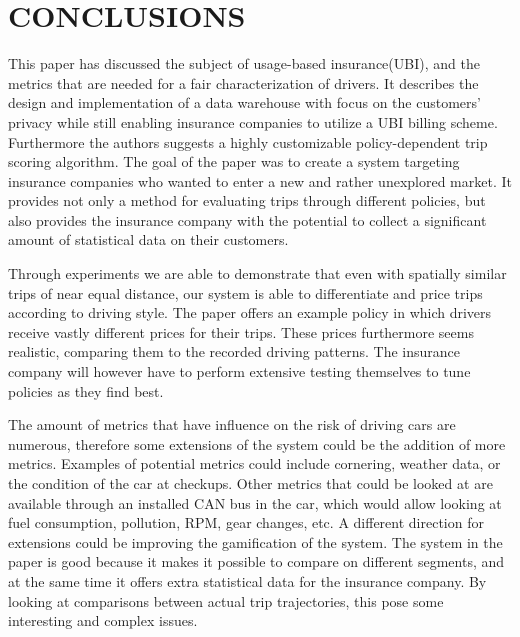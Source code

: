 \section{CONCLUSIONS}
This paper has discussed the subject of usage-based insurance(UBI), and the metrics that are needed for a fair characterization of drivers. It describes the design and implementation of a data warehouse with focus on the customers' privacy while still enabling insurance companies to utilize a UBI billing scheme. Furthermore the authors suggests a highly customizable policy-dependent trip scoring algorithm.
The goal of the paper was to create a system targeting insurance companies who wanted to enter a new and rather unexplored market. It provides not only a method for evaluating trips through different policies, but also provides the insurance company with the potential to collect a significant amount of statistical data on their customers.

Through experiments we are able to demonstrate that even with spatially similar trips of near equal distance, our system is able to differentiate and price trips according to driving style. The paper offers an example policy in which drivers receive vastly different prices for their trips. These prices furthermore seems realistic, comparing them to the recorded driving patterns. The insurance company will however have to perform extensive testing themselves to tune policies as they find best. 

The amount of metrics that have influence on the risk of driving cars are numerous, therefore some extensions of the system could be the addition of more metrics. Examples of potential metrics could include cornering, weather data, or the condition of the car at checkups. Other metrics that could be looked at are available through an installed CAN bus in the car, which would allow looking at fuel consumption, pollution, RPM, gear changes, etc.
A different direction for extensions could be improving the gamification of the system. The system in the paper is good because it makes it possible to compare on different segments, and at the same time it offers extra statistical data for the insurance company. By looking at comparisons between actual trip trajectories, this pose some interesting and complex issues.


\addtolength{\textheight}{-12cm}   %
